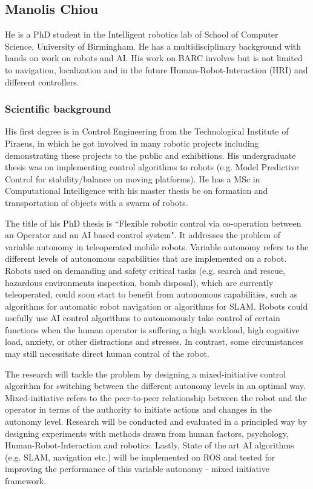 \documentclass[conference]{IEEEtran}
\begin{document}
\subsection{Manolis Chiou}

He is a PhD student in the Intelligent robotics lab of School of Computer Science, University of Birmingham. He has a multidisciplinary background with hands on work on robots and AI. His work on BARC involves but is not limited to navigation, localization and in the future Human-Robot-Interaction (HRI) and different controllers.

\subsubsection*{Scientific background}

His first degree is in Control Engineering from the Technological Institute of Piraeus, in which he got involved in many robotic projects including demonstrating these projects to the public and exhibitions. His undergraduate thesis was on implementing control algorithms to robots (e.g. Model Predictive Control for stability/balance on moving platforms). He has a MSc in Computational Intelligence with his master thesis be on formation and transportation of objects with a swarm of robots.  

The title of his PhD thesis is ``Flexible robotic control via co-operation between an Operator and an AI based control system". It addresses the problem of variable autonomy in teleoperated mobile robots. Variable autonomy refers to the different levels of autonomous capabilities that are implemented on a robot. Robots used on demanding and safety critical tasks (e.g. search and rescue, hazardous environments inspection, bomb disposal), which are currently teleoperated, could soon start to benefit from autonomous capabilities, such as algorithms for automatic robot navigation or algorithms for SLAM. Robots could usefully use AI control algorithms to autonomously take control of certain functions when the human operator is suffering a high workload, high cognitive load, anxiety, or other distractions and stresses. In contrast, some circumstances may still necessitate direct human control of the robot.

The research will tackle the problem by designing a mixed-initiative control algorithm for switching between the different autonomy levels in an optimal way. Mixed-initiative refers to the peer-to-peer relationship between the robot and the operator in terms of the authority to initiate actions and changes in the autonomy level. Research will be conducted and evaluated in a principled way by designing experiments with methods drawn from human factors, psychology, Human-Robot-Interaction and robotics. Lastly, State of the art AI algorithms (e.g. SLAM, navigation etc.) will be implemented on ROS and tested for improving the performance of this variable autonomy - mixed initiative framework.
\end{document}

